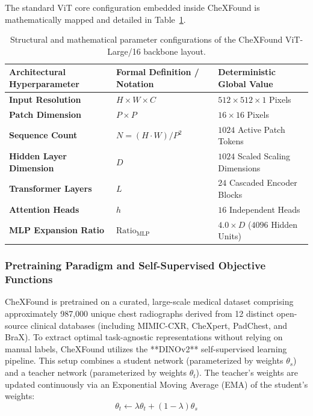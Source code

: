 The standard ViT core configuration embedded inside CheXFound is mathematically mapped and detailed in Table~\ref{tab:vit_large_specs}.

\begin{table}[htbp]
	\centering
	\caption{Structural and mathematical parameter configurations of the CheXFound ViT-Large/16 backbone layout.}
	\label{tab:vit_large_specs}
	\small
	\begin{tabularx}{\textwidth}{lXX}
		\toprule
		\textbf{Architectural Hyperparameter} & \textbf{Formal Definition / Notation} & \textbf{Deterministic Global Value} \\
		\midrule
		\textbf{Input Resolution} & $H \times W \times C$ & $512 \times 512 \times 1$ Pixels \\
		\addlinespace
		\textbf{Patch Dimension} & $P \times P$ & $16 \times 16$ Pixels \\
		\addlinespace
		\textbf{Sequence Count} & $N = (H \cdot W)/P^2$ & $1024$ Active Patch Tokens \\
		\addlinespace
		\textbf{Hidden Layer Dimension} & $D$ & $1024$ Scaled Scaling Dimensions \\
		\addlinespace
		\textbf{Transformer Layers} & $L$ & $24$ Cascaded Encoder Blocks \\
		\addlinespace
		\textbf{Attention Heads} & $h$ & $16$ Independent Heads \\
		\addlinespace
		\textbf{MLP Expansion Ratio} & $\text{Ratio}_{\text{MLP}}$ & $4.0 \times D$ ($4096$ Hidden Units) \\
		\bottomrule
	\end{tabularx}
\end{table}

\subsubsection{Pretraining Paradigm and Self-Supervised Objective Functions}

CheXFound is pretrained on a curated, large-scale medical dataset comprising approximately 987,000 unique chest radiographs derived from 12 distinct open-source clinical databases (including MIMIC-CXR, CheXpert, PadChest, and BraX). To extract optimal task-agnostic representations without relying on manual labels, CheXFound utilizes the **DINOv2** self-supervised learning pipeline. This setup combines a student network (parameterized by weights $\theta_s$) and a teacher network (parameterized by weights $\theta_t$). The teacher's weights are updated continuously via an Exponential Moving Average (EMA) of the student's weights:
\begin{equation}
	\theta_t \leftarrow \lambda \theta_t + (1 - \lambda)\theta_s
\end{equation}

